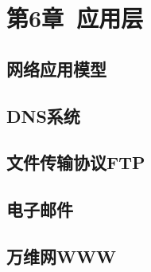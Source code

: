 \documentclass{ctexart}
\begin{document}
\section{第6章\ 应用层}
\subsection{网络应用模型}
\subsection{DNS系统}
\subsection{文件传输协议FTP}
\subsection{电子邮件}
\subsection{万维网WWW}
\end{document}
